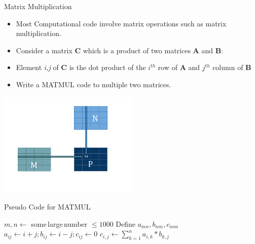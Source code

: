 \documentclass[10pt,t]{beamer}
\begin{document}
\begin{frame}[allowframebreaks]{Matrix Multiplication}
  \begin{itemize}
    \item Most Computational code involve matrix operations such as matrix multiplication.
    \item Consider a matrix {\bf C} which is a product of two matrices {\bf A} and {\bf B}:
    \item[] Element {\it i,j} of {\bf C} is the dot product of the $i^{th}$ row of {\bf A} and $j^{th}$ column of {\bf B}
    \item Write a MATMUL code to multiple two matrices.
  \end{itemize}
  \begin{center}
    \includegraphics[width=0.5\textwidth]{./matmul}
  \end{center}

  \begin{algorithm}[H]
    \caption{Pseudo Code for MATMUL}
    \begin{algorithmic}
      \State $m,n \gets$ some\,large\,number $\le 1000$
      \State Define $a_{mn}, b_{nm}, c_{mm}$
      \State $a_{ij} \gets i+j; b_{ij} \gets i-j; c_{ij} \gets 0$
      \State $c_{i,j} \gets \sum^{n}_{k=1} a_{i,k}*b_{k,j}$
      \EndDo
      \EndDo
    \end{algorithmic}
  \end{algorithm}
\end{frame}
\end{document}
